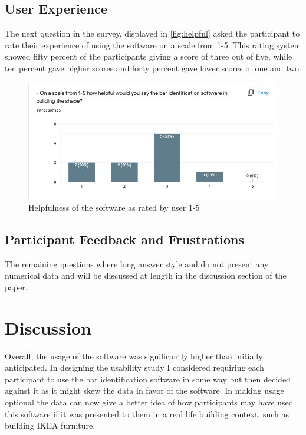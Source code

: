 \documentclass{vgtc}                          %
\begin{document}
\subsection{User Experience}


The next question in the survey, displayed in \autoref{fig:helpful} asked the participant to rate their experience of using the software on a scale from 1-5. This rating system showed fifty percent of the participants giving a score of three out of five, while ten percent gave higher scores and forty percent gave lower scores of one and two. 





\begin{figure}[!htbp]
    \centering
    \includegraphics[width=\columnwidth]{pictures/helpful.png}
    \caption{Helpfulness of the software as rated by user 1-5}
    \label{fig:helpful}
\end{figure}


\subsection{Participant Feedback and Frustrations}

The remaining questions where long answer style and do not present any numerical data and will be discussed at length in the discussion section of the paper.


\section{Discussion}

Overall, the usage of the software was significantly higher than initially anticipated. In designing the usability study I considered requiring each participant to use the bar identification software in some way but then decided against it as it might skew the data in favor of the software. In making usage optional the data can now give a better idea of how participants may have used this software if it was presented to them in a real life building context, such as building IKEA furniture. 
\end{document}
